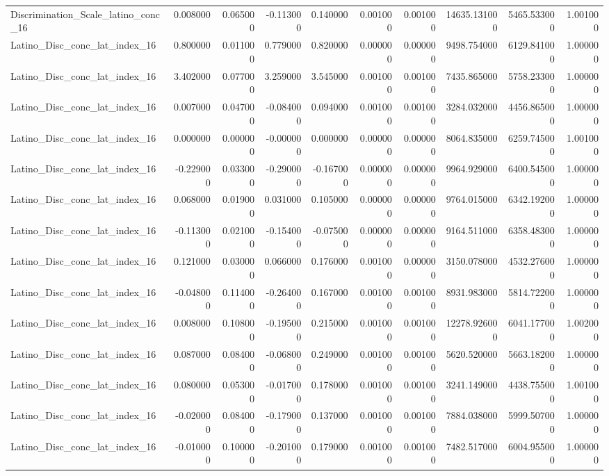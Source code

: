 \begin{table}
\begin{tabular}{lrrrrrrrrr}
Discrimination_Scale_latino_conc_16 & 0.008000 & 0.065000 & -0.113000 & 0.140000 & 0.001000 & 0.001000 & 14635.131000 & 5465.533000 & 1.001000 \\
Latino_Disc_conc_lat_index_16 & 0.800000 & 0.011000 & 0.779000 & 0.820000 & 0.000000 & 0.000000 & 9498.754000 & 6129.841000 & 1.000000 \\
Latino_Disc_conc_lat_index_16 & 3.402000 & 0.077000 & 3.259000 & 3.545000 & 0.001000 & 0.001000 & 7435.865000 & 5758.233000 & 1.000000 \\
Latino_Disc_conc_lat_index_16 & 0.007000 & 0.047000 & -0.084000 & 0.094000 & 0.001000 & 0.001000 & 3284.032000 & 4456.865000 & 1.000000 \\
Latino_Disc_conc_lat_index_16 & 0.000000 & 0.000000 & -0.000000 & 0.000000 & 0.000000 & 0.000000 & 8064.835000 & 6259.745000 & 1.001000 \\
Latino_Disc_conc_lat_index_16 & -0.229000 & 0.033000 & -0.290000 & -0.167000 & 0.000000 & 0.000000 & 9964.929000 & 6400.545000 & 1.000000 \\
Latino_Disc_conc_lat_index_16 & 0.068000 & 0.019000 & 0.031000 & 0.105000 & 0.000000 & 0.000000 & 9764.015000 & 6342.192000 & 1.000000 \\
Latino_Disc_conc_lat_index_16 & -0.113000 & 0.021000 & -0.154000 & -0.075000 & 0.000000 & 0.000000 & 9164.511000 & 6358.483000 & 1.000000 \\
Latino_Disc_conc_lat_index_16 & 0.121000 & 0.030000 & 0.066000 & 0.176000 & 0.001000 & 0.000000 & 3150.078000 & 4532.276000 & 1.000000 \\
Latino_Disc_conc_lat_index_16 & -0.048000 & 0.114000 & -0.264000 & 0.167000 & 0.001000 & 0.001000 & 8931.983000 & 5814.722000 & 1.000000 \\
Latino_Disc_conc_lat_index_16 & 0.008000 & 0.108000 & -0.195000 & 0.215000 & 0.001000 & 0.001000 & 12278.926000 & 6041.177000 & 1.002000 \\
Latino_Disc_conc_lat_index_16 & 0.087000 & 0.084000 & -0.068000 & 0.249000 & 0.001000 & 0.001000 & 5620.520000 & 5663.182000 & 1.000000 \\
Latino_Disc_conc_lat_index_16 & 0.080000 & 0.053000 & -0.017000 & 0.178000 & 0.001000 & 0.001000 & 3241.149000 & 4438.755000 & 1.001000 \\
Latino_Disc_conc_lat_index_16 & -0.020000 & 0.084000 & -0.179000 & 0.137000 & 0.001000 & 0.001000 & 7884.038000 & 5999.507000 & 1.000000 \\
Latino_Disc_conc_lat_index_16 & -0.010000 & 0.100000 & -0.201000 & 0.179000 & 0.001000 & 0.001000 & 7482.517000 & 6004.955000 & 1.000000 \\

\end{tabular}
\end{table}
